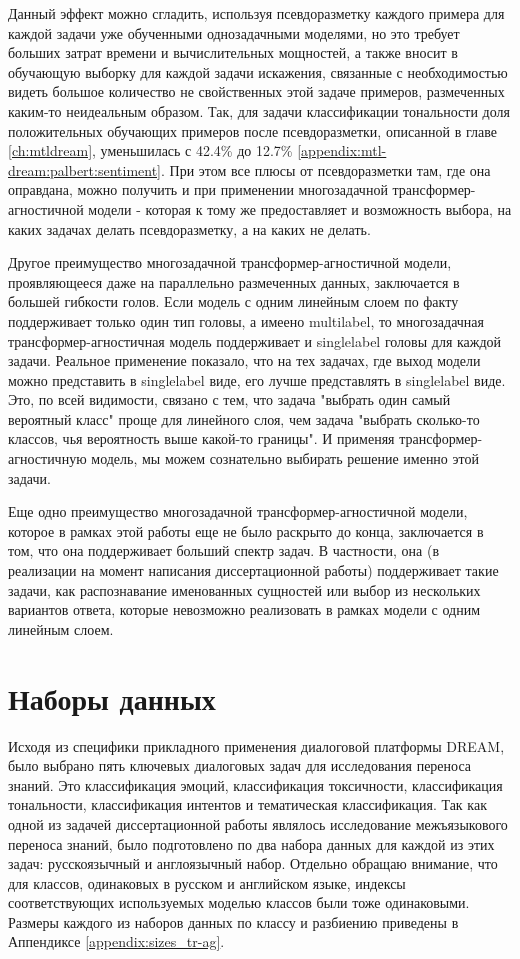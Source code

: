 Данный эффект можно сгладить, используя псевдоразметку каждого примера для каждой задачи уже обученными однозадачными моделями, но это требует больших затрат времени и вычислительных мощностей, а также вносит в обучающую выборку для каждой задачи искажения, связанные с необходимостью видеть большое количество не свойственных этой задаче примеров, размеченных каким-то неидеальным образом. Так, для задачи классификации тональности доля положительных обучающих примеров после псевдоразметки, описанной в главе \ref{ch:mtldream}, уменьшилась с 42.4\% до 12.7\% \ref{appendix:mtl-dream:palbert:sentiment}. При этом все плюсы от псевдоразметки там, где она оправдана, можно получить и при применении многозадачной трансформер-агностичной модели - которая к тому же предоставляет и возможность выбора, на каких задачах делать псевдоразметку, а на каких не делать.

Другое преимущество многозадачной трансформер-агностичной модели, проявляющееся даже на параллельно размеченных данных, заключается в большей гибкости голов. Если модель с одним линейным слоем по факту поддерживает только один тип головы, а имеено multilabel, то многозадачная трансформер-агностичная модель поддерживает и singlelabel головы для каждой задачи. Реальное применение показало, что на тех задачах, где выход модели можно представить в singlelabel виде, его лучше представлять в singlelabel виде. Это, по всей видимости, связано с тем, что задача "выбрать один самый вероятный класс" проще для линейного слоя, чем задача "выбрать сколько-то классов, чья вероятность выше какой-то границы". И применяя трансформер-агностичную модель, мы можем сознательно выбирать решение именно этой задачи.

Еще одно преимущество многозадачной трансформер-агностичной модели, которое в рамках этой работы еще не было раскрыто до конца, заключается в том, что она поддерживает больший спектр задач. В частности, она (в реализации на момент написания диссертационной работы) поддерживает такие задачи, как распознавание именованных сущностей или выбор из нескольких вариантов ответа, которые невозможно реализовать в рамках модели с одним линейным слоем. 


\section{Наборы данных}

Исходя из специфики прикладного применения диалоговой платформы DREAM, было выбрано пять ключевых диалоговых задач для исследования переноса знаний. Это классификация эмоций, классификация токсичности, классификация тональности, классификация интентов и тематическая классификация. Так как одной из задачей диссертационной работы являлось исследование межъязыкового переноса знаний, было подготовлено по два набора данных для каждой из этих задач: русскоязычный и англоязычный набор. Отдельно обращаю внимание, что для классов, одинаковых в русском и английском языке, индексы соответствующих используемых моделью классов были тоже одинаковыми. Размеры каждого из наборов данных по классу и разбиению приведены в Аппендиксе \ref{appendix:sizes_tr-ag}. 

